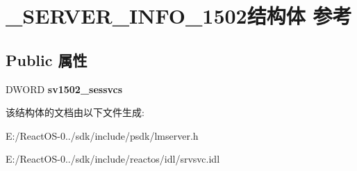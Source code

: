\hypertarget{struct___s_e_r_v_e_r___i_n_f_o__1502}{}\section{\+\_\+\+S\+E\+R\+V\+E\+R\+\_\+\+I\+N\+F\+O\+\_\+1502结构体 参考}
\label{struct___s_e_r_v_e_r___i_n_f_o__1502}
\subsection*{Public 属性}
\begin{DoxyCompactItemize}
\item 
\mbox{\label{struct___s_e_r_v_e_r___i_n_f_o__1502_a8480a1d10852245b58563a3151a0fa10}} 
D\+W\+O\+RD {\bfseries sv1502\+\_\+sessvcs}
\end{DoxyCompactItemize}


该结构体的文档由以下文件生成\+:\begin{DoxyCompactItemize}
\item 
E\+:/\+React\+O\+S-\/0../sdk/include/psdk/lmserver.\+h\item 
E\+:/\+React\+O\+S-\/0../sdk/include/reactos/idl/srvsvc.\+idl\end{DoxyCompactItemize}
